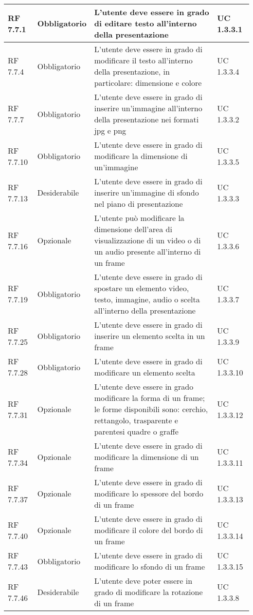 {\begin{longtable} [c]{| p{2.5cm} | p{2.5cm} | p{6cm} |p{2.5cm}|}
 \hline 
RF 7.7.1 & Obbligatorio & L'utente deve essere in grado di editare testo all'interno della presentazione & UC 1.3.3.1\\ 
 \hline 
RF 7.7.4 & Obbligatorio & L'utente deve essere in grado di modificare il testo all'interno della presentazione, in particolare: dimensione e colore & UC 1.3.3.4\\ 
 \hline 
RF 7.7.7 & Obbligatorio &  L'utente deve essere in grado di inserire un'immagine all'interno della presentazione nei formati jpg e png & UC 1.3.3.2\\ 
 \hline 
RF 7.7.10 & Obbligatorio & L'utente deve essere in grado di modificare la dimensione di un'immagine & UC 1.3.3.5\\ 
 \hline 
RF 7.7.13 & Desiderabile &  L'utente deve essere in grado di inserire un'immagine di sfondo nel piano di presentazione & UC 1.3.3.3\\ 
 \hline 
RF 7.7.16 & Opzionale & L'utente può modificare la dimensione dell'area di visualizzazione di un video o di un audio presente all'interno di un frame & UC 1.3.3.6\\ 
 \hline 
RF 7.7.19 & Obbligatorio & L'utente deve essere in grado di spostare un elemento video, testo, immagine, audio o scelta all'interno della presentazione & UC 1.3.3.7\\ 
 \hline 
RF 7.7.25 & Obbligatorio & L'utente deve essere in grado di inserire un elemento scelta in un frame & UC 1.3.3.9\\ 
 \hline 
RF 7.7.28 & Obbligatorio & L'utente deve essere in grado di modificare un elemento scelta & UC 1.3.3.10\\ 
 \hline 
RF 7.7.31 & Opzionale & L'utente deve essere in grado modificare la forma di un frame; le forme disponibili sono: cerchio, rettangolo, trasparente e parentesi quadre o graffe & UC 1.3.3.12\\ 
 \hline 
RF 7.7.34 & Opzionale & L'utente deve essere in grado di modificare la dimensione di un frame & UC 1.3.3.11\\ 
 \hline 
RF 7.7.37 & Opzionale & L'utente deve essere in grado di modificare lo spessore del bordo di un frame & UC 1.3.3.13\\ 
 \hline 
RF 7.7.40 & Opzionale & L'utente deve essere in grado di modificare il colore del bordo di un frame & UC 1.3.3.14\\ 
 \hline 
RF 7.7.43 & Obbligatorio & L'utente deve essere in grado di modificare lo sfondo di un frame & UC 1.3.3.15\\ 
 \hline 
RF 7.7.46 & Desiderabile & L'utente deve poter essere in grado di modificare la rotazione di un frame & UC 1.3.3.8\\ 

\end{longtable}}
